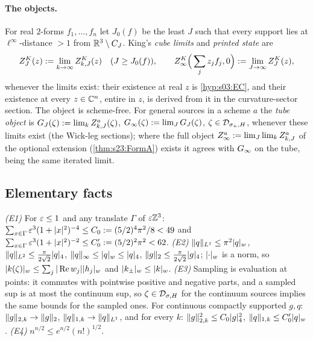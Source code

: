 \paragraph{The objects.} For real $2$-forms $f_1,\dots,f_n$ let $J_0(f)$ be the least $J$ such that every support lies at $\ell^\infty$-distance $>1$ from $\mathbb R^3\setminus C_J$. King's \emph{cube limits} and \emph{printed state} are
\[
Z^{K}_{J}(z):=\lim_{k\to\infty}Z^K_{k,J}(z)\quad(J\ge J_0(f)),\qquad
Z^{K}_{\infty}\Big(\sum_jz_jf_j,0\Big):=\lim_{J\to\infty}Z^{K}_{J}(z),
\]
whenever the limits exist: their existence at real $z$ is \cref{hyp:s03:EC}, and their existence at every $z\in\mathbb C^n$, entire in $z$, is derived from it in the curvature-sector section. The object is scheme-free. For general sources in a scheme $a$ the \emph{tube object} is $G_J(\zeta):=\lim_kZ^a_{k,J}(\zeta)$, $G_\infty(\zeta):=\lim_JG_J(\zeta)$, $\zeta\in\mathcal D_{\sigma_+,H}$, whenever these limits exist (the Wick-leg sections); where the full object $Z^a_\infty:=\lim_J\lim_kZ^a_{k,J}$ of the optional extension (\cref{thm:s23:FormA}) exists it agrees with $G_\infty$ on the tube, being the same iterated limit.

\subsection{Elementary facts}

\begin{lemma}\label{lem:s02:E}
\emph{(E1)} For $\varepsilon\le1$ and any translate $\Gamma$ of $\varepsilon\mathbb Z^3$: $\sum_{x\in\Gamma}\varepsilon^3(1+|x|^2)^{-4}\le C_0:=(5/2)^4\pi^2/8<49$ and $\sum_{x\in\Gamma}\varepsilon^3(1+|x|^2)^{-2}\le C_0':=(5/2)^2\pi^2<62$.
\emph{(E2)} $\lVert q\rVert_{L^1}\le\pi^2\lvert q\rvert_{w}$, $\lVert q\rVert_{L^2}\le\frac{\pi}{2\sqrt2}\lvert q\rvert_{4}$, $\lVert q\rVert_\infty\le\lvert q\rvert_{w}\le\lvert q\rvert_{4}$, $\lVert g\rVert_2\le\frac{\pi}{2\sqrt2}\lvert g\rvert_{4}$; $\lvert \cdot\rvert_{w}$ is a norm, so $\lvert k(\zeta)\rvert_{w}\le\sum_j|\operatorname{Re} w_j|\lvert h_j\rvert_{w}$ and $\lvert k_\pm\rvert_{w}\le\lvert k\rvert_{w}$.
\emph{(E3)} Sampling is evaluation at points: it commutes with pointwise positive and negative parts, and a sampled sup is at most the continuum sup, so $\zeta\in\mathcal D_{\sigma,H}$ for the continuum sources implies the same bounds for the sampled ones. For continuous compactly supported $g,q$: $\lVert g\rVert_{2,k}\to\lVert g\rVert_2$, $\lVert q\rVert_{1,k}\to\lVert q\rVert_{L^1}$, and for every $k$: $\lVert g\rVert_{2,k}^2\le C_0\lvert g\rvert_{4}^2$, $\lVert q\rVert_{1,k}\le C_0'\lvert q\rvert_{w}$.
\emph{(E4)} $n^{n/2}\le e^{n/2}(n!)^{1/2}$.
\end{lemma}

